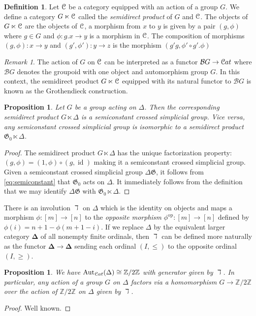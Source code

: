 \documentclass[english,11pt,leqno]{article}
\def\Gen{\mathfrak{G}}
\def\Aut{\operatorname{Aut}\nolimits}
\def\id{\operatorname{id}}
\def\op{{\operatorname{op}}}
\def\Cat{{\mathcal Cat}}
\def\B{ {\EuScript B}}
\def\C{{\EuScript C}}
\def\Zt{\mathbb{Z}/2\mathbb{Z}}
\def\B{{\mathcal B}}
\def\Cat{{\EuScript Cat}}
\def\DG{ {\Delta \Gen}}
\newtheorem{prop}[thm]{Proposition}
\theoremstyle{definition}
\newtheorem{defi}[thm]{Definition}
\theoremstyle{remark}
\newtheorem{rem}[thm]{Remark}
\numberwithin{equation}{section}
\begin{document}
\begin{defi}\label{defi:semidirect} Let $\C$ be a category equipped with an action of a group $G$. We define a category $G
	\ltimes \C$ called the {\em semidirect product} of $G$ and $\C$. The objects of $G \ltimes
	\C$ are the objects of $\C$, a morphism from $x$ to $y$ is given by a pair $(g, \phi)$ where
	$g \in G$ and $\phi: g.x \to y$ is a morphism in $\C$. The composition of morphisms $(g,
	\phi): x \to y$ and $(g', \phi'): y \to z$ is the morphism $(g'g, \phi' \circ g'.\phi)$
\end{defi}

\begin{rem} The action of $G$ on $\C$ can be interpreted as a functor $\B G \to \Cat$ where $\B G$
	denotes the groupoid with one object and automorphism group $G$. In this context, the semidirect 
	product $G \ltimes \C$ equipped with its natural functor to $\B G$ is known as the Grothendieck 
	construction. 
\end{rem}

\begin{prop}\label{prop:semi} Let $G$ be a group acting on $\Delta$. Then the corresponding semidirect product $G
	\ltimes \Delta$ is a semiconstant crossed simplicial group. Vice versa, any semiconstant
	crossed simplicial group is isomorphic to a semidirect product $\Gen_0 \ltimes \Delta$.
\end{prop}
\begin{proof} 
	The semidirect product $G \ltimes \Delta$ has the unique factorization property:
	$(g, \phi) = (1, \phi) \circ (g, \id)$ making it a semiconstant crossed simplicial group.
	Given a semiconstant crossed simplicial group $\DG$, it follows from
	\eqref{eq:semiconstant} that $\Gen_0$ acts on $\Delta$. It immediately follows from the
	definition that we may identify $\DG$ with $\Gen_0 \ltimes \Delta$.
\end{proof}

There is an involution $\daleth$ on $\Delta$ which is the identity on objects and maps a morphism 
$\phi:[m] \to [n]$ to the {\em opposite morphism} $\phi^{\op}:[m] \to [n]$ defined by 
$\phi(i) = n+1 - \phi(m+1-i)$. If we replace $\Delta$ by the equivalent larger category
$\mathbf\Delta$ of all nonempty finite ordinals, then $\daleth$ can be defined more naturally as
the functor ${\mathbf\Delta} \to{\mathbf\Delta}$ sending each ordinal $(I, \leq)$ to the opposite
ordinal $(I, \geq)$. 

\begin{prop} We have $\Aut_{\Cat}(\Delta) \cong \Zt$ with generator given by $\daleth$. In
	particular, any action of a group $G$ on $\Delta$ factors via a homomorphism $G \to \Zt$ 
	over the action of $\Zt$ on $\Delta$ given by $\daleth$.
\end{prop}
\begin{proof} Well known.
\end{proof}
\end{document}
